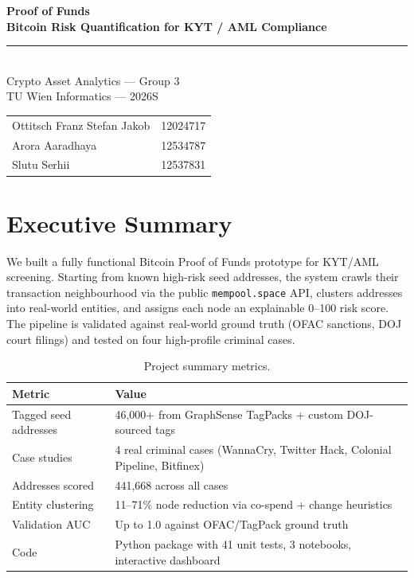 \documentclass[a4paper,11pt]{article}
\begin{document}
\begin{titlepage}
\centering
\vspace*{2cm}

{\Huge\bfseries Proof of Funds}\\[8pt]
{\LARGE\bfseries Bitcoin Risk Quantification for KYT / AML Compliance}\\[20pt]

\rule{0.6\textwidth}{0.5pt}\\[16pt]

{\Large Crypto Asset Analytics --- Group 3}\\[4pt]
{\large TU Wien Informatics --- 2026S}\\[40pt]

\begin{tabular}{ll}
Ottitsch Franz Stefan Jakob & 12024717\\
Arora Aaradhaya & 12534787 \\
Slutu Serhii & 12537831 \\
\end{tabular}

\vfill

\end{titlepage}

\tableofcontents
\newpage

\section{Executive Summary}

We built a fully functional Bitcoin Proof of Funds prototype for KYT/AML screening.
Starting from known high-risk seed addresses, the system crawls their transaction neighbourhood via the public \texttt{mempool.space} API, clusters addresses into real-world entities, and assigns each node an explainable 0--100 risk score.
The pipeline is validated against real-world ground truth (OFAC sanctions, DOJ court filings) and tested on four high-profile criminal cases.

\begin{table}[H]
\centering
\caption{Project summary metrics.}
\begin{tabularx}{\textwidth}{@{}lX@{}}
\toprule
\textbf{Metric} & \textbf{Value} \\
\midrule
Tagged seed addresses & 46{,}000+ from GraphSense TagPacks + custom DOJ-sourced tags \\
Case studies & 4 real criminal cases (WannaCry, Twitter Hack, Colonial Pipeline, Bitfinex) \\
Addresses scored & 441{,}668 across all cases \\
Entity clustering & 11--71\% node reduction via co-spend + change heuristics \\
Validation AUC & Up to 1.0 against OFAC/TagPack ground truth \\
Code & Python package with 41 unit tests, 3 notebooks, interactive dashboard \\
\bottomrule
\end{tabularx}
\end{table}
\end{document}
